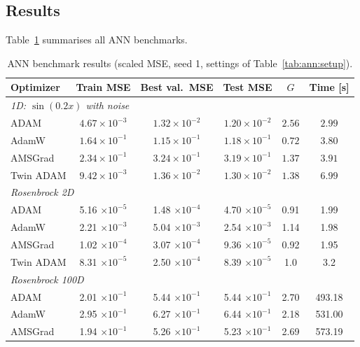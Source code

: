 \documentclass[11pt,a4paper]{article}
\begin{document}
\FloatBarrier
\subsection{Results}
\label{sec:ann:results}
Table~\ref{tab:ann:results} summarises all ANN benchmarks.

\begin{table}[!htbp]
  \centering
  \caption{ANN benchmark results (scaled MSE, seed 1, settings of Table~\ref{tab:ann:setup}).}
  \label{tab:ann:results}
  \small
  \begin{tabular}{lccccc}
    \toprule
    \textbf{Optimizer} & \textbf{Train MSE} & \textbf{Best val.\ MSE} & \textbf{Test MSE} & \textbf{$G$} & \textbf{Time [s]}  \\
    \midrule
    \multicolumn{6}{l}{\textit{1D: $\sin(0.2x)$ with noise}} \\
    ADAM      & $4.67\times10^{-3}$ & $1.32\times10^{-2}$ & $1.20\times10^{-2}$ & $2.56$ & $2.99$ \\
    AdamW     & $1.64\times10^{-1}$ & $1.15\times10^{-1}$ & $1.18\times10^{-1}$ & $0.72$ & $3.80$ \\
    AMSGrad   & $2.34\times10^{-1}$ & $3.24\times10^{-1}$ & $3.19\times10^{-1}$ & $1.37$ & $3.91$ \\
    Twin ADAM & $9.42\times10^{-3}$ & $1.36\times10^{-2}$ & $1.30\times10^{-2}$ & $1.38$ & $6.99$ \\
    \midrule
    \multicolumn{6}{l}{\textit{Rosenbrock 2D}} \\
    ADAM      & 5.16 $\times10^{-5}$ & 1.48 $\times10^{-4}$ & 4.70 $\times10^{-5}$ & 0.91 & 1.99  \\
    AdamW     & 2.21 $\times10^{-3}$ & 5.04 $\times10^{-3}$ & 2.54 $\times10^{-3}$ & 1.14 & 1.98  \\
    AMSGrad   & 1.02 $\times10^{-4}$ & 3.07 $\times10^{-4}$ & 9.36 $\times10^{-5}$ & 0.92 & 1.95 \\
    Twin ADAM & 8.31 $\times10^{-5}$ & 2.50 $\times10^{-4}$ & 8.39 $\times10^{-5}$ & 1.0 & 3.2  \\
    \midrule
    \multicolumn{6}{l}{\textit{Rosenbrock 100D}} \\
    ADAM      & 2.01 $\times10^{-1}$ & 5.44 $\times10^{-1}$ & 5.44 $\times10^{-1}$ & 2.70 & 493.18  \\
    AdamW     & 2.95 $\times10^{-1}$ & 6.27 $\times10^{-1}$ & 6.44 $\times10^{-1}$ & 2.18 & 531.00  \\
    AMSGrad   & 1.94 $\times10^{-1}$ & 5.26 $\times10^{-1}$ & 5.23 $\times10^{-1}$ & 2.69 & 573.19 \\

\end{tabular}
\end{table}
\end{document}
